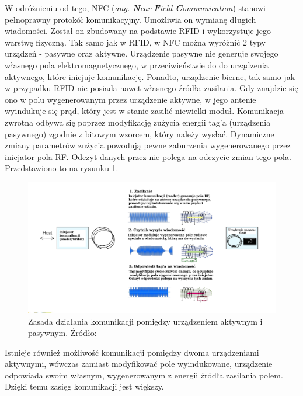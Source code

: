 W odróżnieniu od tego, NFC (\textit{ang. \textbf{N}ear \textbf{F}ield \textbf{C}ommunication}) stanowi pełnoprawny protokół komunikacyjny. Umożliwia on wymianę długich wiadomości. Został on zbudowany na podstawie RFID i wykorzystuje jego warstwę fizyczną. Tak samo jak w RFID, w NFC można wyróżnić 2 typy urządzeń - pasywne oraz aktywne. Urządzenie pasywne nie generuje swojego własnego pola elektromagnetycznego, w przeciwieństwie do do urządzenia aktywnego, które inicjuje komunikację. Ponadto, urządzenie bierne, tak samo jak w przypadku RFID nie posiada nawet własnego źródła zasilania. Gdy znajdzie się ono w polu wygenerowanym przez urządzenie aktywne, w jego antenie wyindukuje się prąd, który jest w stanie zasilić niewielki moduł. Komunikacja zwrotna odbywa się poprzez modyfikację zużycia energii tag'a (urządzenia pasywnego) zgodnie z bitowym wzorcem, który należy wysłać. Dynamiczne zmiany parametrów zużycia powodują pewne zaburzenia wygenerowanego przez inicjator pola RF. Odczyt danych przez nie polega na odczycie zmian tego pola. Przedstawiono to na rysunku \ref{fig:image_nfc_comm}. 

\begin{figure}[H]
	\centering
	\includegraphics[width=18cm]{img/theory/NFC/NFC_communication.png}
	\caption{Zasada działania komunikacji pomiędzy urządzeniem aktywnym i pasywnym. Źródło: \cite{NFC_NXP}}
	\label{fig:image_nfc_comm}
\end{figure}

Istnieje również możliwość komunikacji pomiędzy dwoma urządzeniami aktywnymi, wówczas zamiast modyfikować pole wyindukowane, urządzenie odpowiada swoim własnym, wygenerowanym z energii źródła zasilania polem. Dzięki temu zasięg komunikacji jest większy. 

